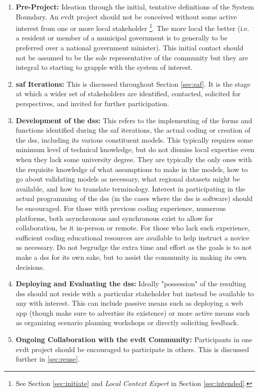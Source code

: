 \begin{enumerate} \setlength{\itemsep}{0pt} \setlength{\parskip}{0pt}
    \item{\textbf{Pre-Project:} Ideation through the initial, tentative definitions of the System Boundary. An \ac{evdt} project should not be conceived without some active interest from one or more local stakeholder \footnote{See Section \ref{sec:initiate} and \textit{Local Context Expert} in Section \ref{sec:intended}.}.  The more local the better (i.e. a resident or member of a municipal government is to generally to be preferred over a national government minister). This initial contact should not be assumed to be the sole representative of the community but they are integral to starting to grapple with the system of interest.}
	\item{\textbf{\ac{saf} Iterations:} This is discussed throughout Section \ref{sec:saf}. It is the stage at which a wider set of stakeholders are identified, contacted, solicited for perspectives, and invited for further participation.}
	\item{\textbf{Development of the \ac{dss}:} This refers to the implementing of the forms and functions identified during the \ac{saf} iterations, the actual coding or creation of the \ac{dss}, including its various constituent models. This typically requires some minimum level of technical knowledge, but do not dismiss local expertise even when they lack some university degree. They are typically the only ones with the requisite knowledge of what assumptions to make in the models, how to go about validating models as necessary, what regional datasets might be available, and how to translate terminology. Interest in participating in the actual programming of the \ac{dss} (in the cases where the \ac{dss} is software) should be encouraged. For those with previous coding experience, numerous platforms, both asynchronous and synchronous exist to allow for collaboration, be it in-person or remote. For those who lack such experience, sufficient coding educational resources are available to help instruct a novice as necessary. Do not begrudge the extra time and effort as the goals is to not make a \ac{dss} for its own sake, but to assist the community in making its own decisions.}
	\item{\textbf{Deploying and Evaluating the \ac{dss}:} Ideally "possession" of the resulting \ac{dss} should not reside with a particular stakeholder but instead be available to any with interest. This can include passive means such as deploying a web app (though make sure to advertise its existence) or more active means such as organizing scenario planning workshops or directly soliciting feedback.}
	\item{\textbf{Ongoing Collaboration with the \ac{evdt} Community:} Participants in one \ac{evdt} project should be encouraged to participate in others. This is discussed further in \ref{sec:reuse}.}
\end{enumerate}

